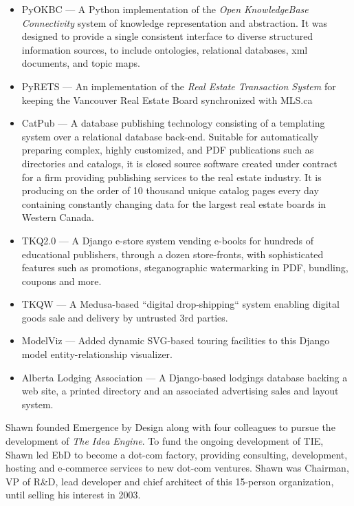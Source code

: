 \documentclass[line,margin,hidelinks]{res}
\begin{document}
\begin{resume}
\begin{position}
\begin{itemize}
  \item PyOKBC --- A Python implementation of the
     \emph{Open KnowledgeBase Connectivity}
  system of knowledge representation and abstraction.
  It was designed to provide a single consistent interface to diverse structured
  information sources, to include ontologies, relational databases,
  xml documents, and topic maps. %

  \item PyRETS --- An implementation of the \emph{Real Estate Transaction System}
  for keeping the Vancouver Real Estate Board synchronized with MLS.ca

  \item CatPub --- A database publishing technology consisting of a
  \PS templating system over a relational database back-end.
  Suitable for automatically preparing complex, highly customized,
  \PS and PDF publications such as directories and catalogs,
  it is closed source software created under contract for a firm
  providing publishing services to the real estate industry.
  It is producing on the order of 10 thousand unique catalog pages
  every day containing constantly changing data for the largest
  real estate boards in Western Canada.

  \item TKQ2.0 --- A Django e-store system vending e-books for hundreds
  of educational publishers, through a dozen store-fronts, with sophisticated
  features such as promotions, steganographic watermarking in PDF, bundling,
  coupons and more.

  \item TKQW --- A Medusa-based ``digital drop-shipping`` system
  enabling digital goods sale and delivery by untrusted 3rd parties.

  \item ModelViz --- Added dynamic SVG-based touring facilities to this Django
  model entity-relationship visualizer.

  \item Alberta Lodging Association --- A Django-based lodgings database
  backing a web site, a printed directory and an associated advertising
  sales and layout system.

\end{itemize}
\end{position}



\begin{position}
  Shawn founded Emergence by Design along with four colleagues to pursue
  the development of \emph{The Idea Engine}.  To fund the ongoing development of
  TIE, Shawn led EbD to become a dot-com factory, providing consulting,
  development, hosting and e-commerce services to new dot-com ventures.
  Shawn was Chairman, VP of R\&D, lead developer and chief architect of this
  15-person organization, until selling his interest in 2003.


\end{position}
\end{resume}
\end{document}
